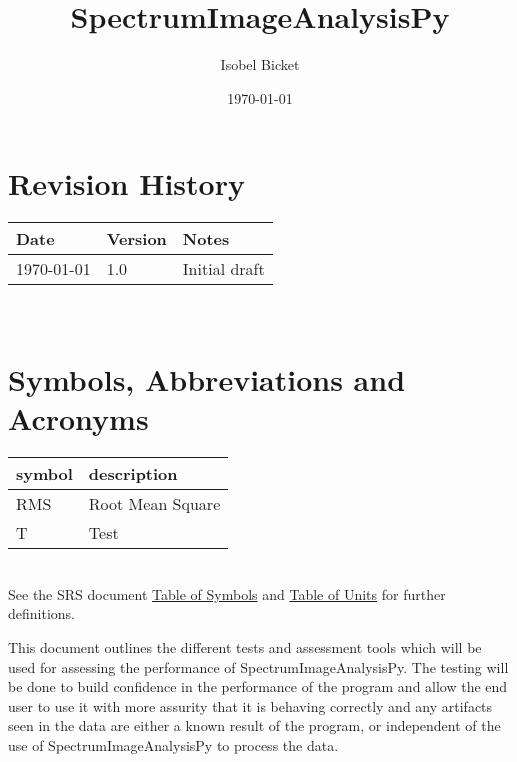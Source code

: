 \documentclass[12pt, titlepage]{article}
\newcommand{\progname}{SpectrumImageAnalysisPy}
\begin{document}

\title{SpectrumImageAnalysisPy} 
\author{Isobel Bicket}
\date{\today}
	
\maketitle


\section{Revision History}

\begin{tabularx}{\textwidth}{p{4cm}p{2cm}X}
\toprule {\bf Date} & {\bf Version} & {\bf Notes}\\
\midrule
\today & 1.0 & Initial draft\\
\bottomrule
\end{tabularx}

~\newpage

\section{Symbols, Abbreviations and Acronyms}

\renewcommand{\arraystretch}{1.2}
\begin{tabular}{l l} 
  \toprule		
  \textbf{symbol} & \textbf{description}\\
  \midrule 
  RMS & Root Mean Square\\
  T & Test\\
  \bottomrule
\end{tabular}\\

See the SRS document \hyperref[TableSymbols]{Table of Symbols} and \hyperref[TableUnits]{Table of Units} for further definitions. 

\newpage

\tableofcontents

\listoftables

\listoffigures

\newpage


This document outlines the different tests and assessment tools which will be used for assessing the performance of \progname{}. The testing will be done to build confidence in the performance of the program and allow the end user to use it with more assurity that it is behaving correctly and any artifacts seen in the data are either a known result of the program, or independent of the use of \progname{} to process the data.
\end{document}
